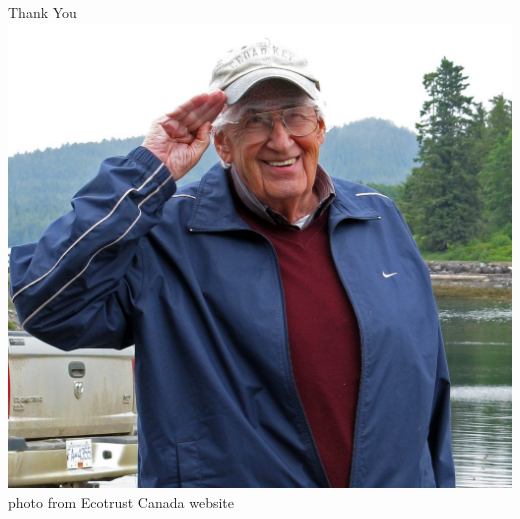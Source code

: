 \documentclass[11,aspectratio=1610]{beamer}
\begin{document}
\begin{frame}[standout]

\centering
Thank You\\
\vfill
\includegraphics[height=0.9\textheight]{img/holling2.jpg} \\
\tiny{photo from Ecotrust Canada website}
  
\end{frame}

\end{document}
